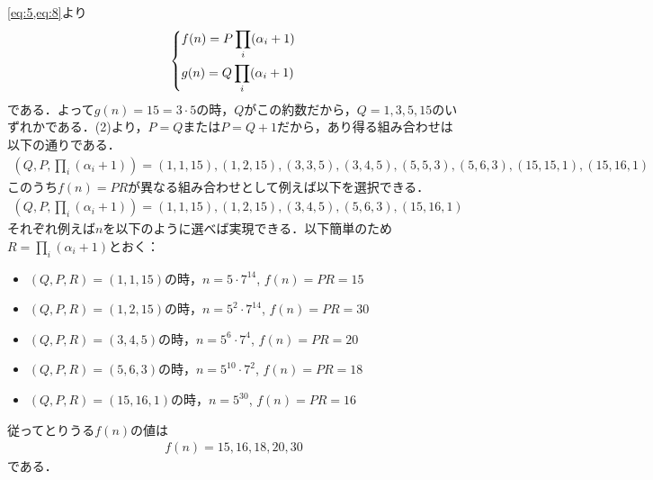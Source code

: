 \documentclass[../../main.tex]{subfiles}
\begin{document}
\cref{eq:5,eq:8}より
\begin{align}
  \begin{dcases}
    f(n) = P\prod_i(\alpha_i+1) \\
    g(n) = Q\prod_i(\alpha_i+1)
  \end{dcases}
\end{align}
である．よって$g(n)=15=3\cdot5$の時，$Q$がこの約数だから，$Q=1,3,5,15$のいずれかである．(2)より，$P=Q$または$P=Q+1$だから，あり得る組み合わせは以下の通りである．
\begin{align}
  \left(Q,P,\prod_i(\alpha_i+1)\right)
  = (1,1,15), (1,2,15), (3,3,5), (3,4,5), (5,5,3), (5,6,3), (15,15,1), (15,16,1)
\end{align}
このうち$f(n)=PR$が異なる組み合わせとして例えば以下を選択できる．
\begin{align}
  \left(Q,P,\prod_i(\alpha_i+1)\right)
  = (1,1,15), (1,2,15), (3,4,5), (5,6,3), (15,16,1)
\end{align}
それぞれ例えば$n$を以下のように選べば実現できる．以下簡単のため$R=\prod_i(\alpha_i+1)$とおく：
\begin{itemize}
  \item $(Q,P,R)=(1,1,15)$の時，$n=5\cdot 7^{14}$, $f(n)=PR=15$
  \item $(Q,P,R)=(1,2,15)$の時，$n=5^2\cdot 7^{14}$, $f(n)=PR=30$
  \item $(Q,P,R)=(3,4,5)$の時，$n=5^6\cdot 7^4$, $f(n)=PR=20$
  \item $(Q,P,R)=(5,6,3)$の時，$n=5^{10}\cdot 7^2$, $f(n)=PR=18$
  \item $(Q,P,R)=(15,16,1)$の時，$n=5^{30}$, $f(n)=PR=16$
\end{itemize}
従ってとりうる$f(n)$の値は
\begin{align}
  f(n) = 15,16,18,20,30
\end{align}
である．

\end{document}
